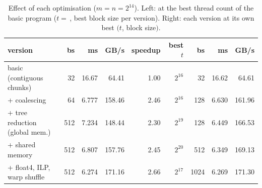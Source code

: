 \begin{table}[H]\centering\small
\caption{Effect of each optimisation ($m=n=2^{14}$). Left: at the best thread count of the basic program ($t=$\,\qtwobasicbestt, best block size per version). Right: each version at its own best $(t$, block size$)$.}\label{tab:q2versions}
\begin{tabular}{lrrrr|rrrr}
\toprule
version & bs & ms & GB/s & speedup & best $t$ & bs & ms & GB/s \\
\midrule
basic (contiguous chunks) & 32 & 16.67 & 64.41 & 1.00 & $2^{16}$ & 32 & 16.62 & 64.61 \\
+ coalescing & 64 & 6.777 & 158.46 & 2.46 & $2^{16}$ & 128 & 6.630 & 161.96 \\
+ tree reduction (global mem.) & 512 & 7.234 & 148.44 & 2.30 & $2^{19}$ & 128 & 6.449 & 166.53 \\
+ shared memory & 512 & 6.807 & 157.76 & 2.45 & $2^{20}$ & 512 & 6.349 & 169.13 \\
+ float4, ILP, warp shuffle & 512 & 6.274 & 171.16 & 2.66 & $2^{17}$ & 1024 & 6.269 & 171.30 \\
\bottomrule
\end{tabular}
\end{table}

